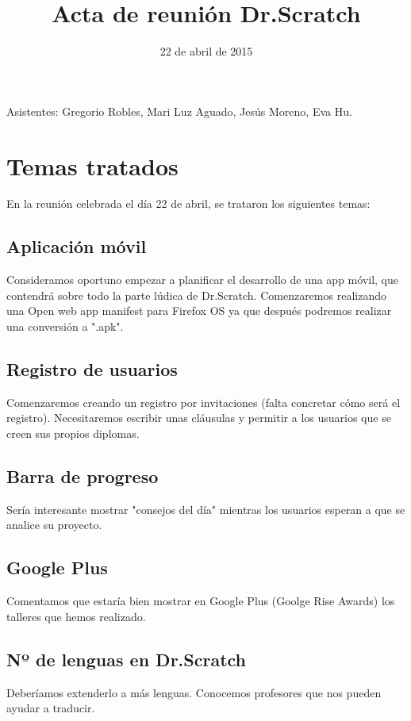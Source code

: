 \documentclass{article}
\title{Acta de reunión Dr.Scratch}
\date{22 de abril de 2015}
\begin{document}
\maketitle
Asistentes: Gregorio Robles, Mari Luz Aguado, Jesús Moreno, Eva Hu.
\section{Temas tratados}
En la reunión celebrada el día 22 de abril, se trataron los siguientes temas:
\subsection{Aplicación móvil}
Consideramos oportuno empezar a planificar el desarrollo de una app móvil, que contendrá sobre todo la parte lúdica de Dr.Scratch. Comenzaremos realizando una Open web app manifest para Firefox OS ya que después podremos realizar una conversión a ".apk".
\subsection{Registro de usuarios}
Comenzaremos creando un registro por invitaciones (falta concretar cómo será el registro). Necesitaremos escribir unas cláusulas y permitir a los usuarios que se creen sus propios diplomas.
\subsection{Barra de progreso}
Sería interesante mostrar "consejos del día" mientras los usuarios esperan a que se analice su proyecto.
\subsection{Google Plus}
Comentamos que estaría bien mostrar en Google Plus (Goolge Rise Awards) los talleres que hemos realizado.
\subsection{Nº de lenguas en Dr.Scratch}
Deberíamos extenderlo a más lenguas. Conocemos profesores que nos pueden ayudar a traducir.
\end{document}
